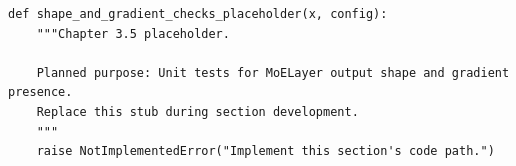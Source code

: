 \begin{lstlisting}[style=bookpython,caption={Planned code placeholder for shape and gradient checks.},label={lst:ch03-shape-and-gradient-checks}]
def shape_and_gradient_checks_placeholder(x, config):
    """Chapter 3.5 placeholder.

    Planned purpose: Unit tests for MoELayer output shape and gradient presence.
    Replace this stub during section development.
    """
    raise NotImplementedError("Implement this section's code path.")
\end{lstlisting}
